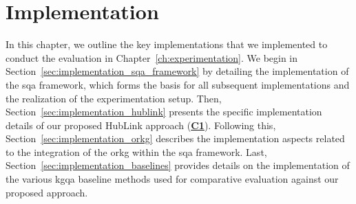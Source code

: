 \chapter{Implementation}
\label{ch:implementation}

In this chapter, we outline the key implementations that we implemented to conduct the evaluation in Chapter~\ref{ch:experimentation}. We begin in Section~\ref{sec:implementation_sqa_framework} by detailing the implementation of the \gls{sqa} framework, which forms the basis for all subsequent implementations and the realization of the experimentation setup. Then, Section~\ref{sec:implementation_hublink} presents the specific implementation details of our proposed HubLink approach (\hyperref[enum:c1]{\textbf{C1}}). Following this, Section~\ref{sec:implementation_orkg} describes the implementation aspects related to the integration of the \gls{orkg} within the \gls{sqa} framework. Last, Section~\ref{sec:implementation_baselines} provides details on the implementation of the various \gls{kgqa} baseline methods used for comparative evaluation against our proposed approach.







